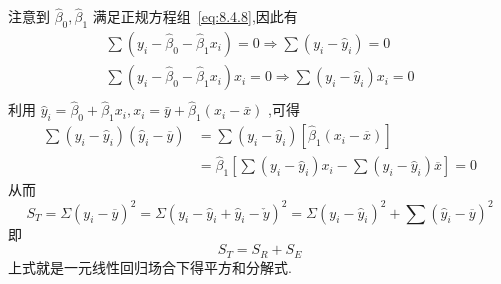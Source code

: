 注意到 $ \hat{\beta}_0, \hat{\beta}_1 $ 满足正规方程组~\ref{eq:8.4.8},因此有
\[
\begin{array}{c}
\sum{\left( y_i-\widehat{\beta }_0-\widehat{\beta }_1x_i \right) =0\Rightarrow \sum{\left( y_i-\hat{y}_i \right)}}=0\\
\sum{\left( y_i-\widehat{\beta }_0-\widehat{\beta }_1x_i \right) x_i=0\Rightarrow \sum{\left( y_i-\hat{y}_i \right)}}x_i=0\\
\end{array}
\]
利用 $ \widehat{y}_i=\widehat{\beta }_0+\widehat{\beta }_1x_i,x_i=\bar{y}+\widehat{\beta }_1\left( x_i-\bar{x} \right)  $ ,可得 
\[
\begin{aligned} 
\sum\left(y_{i}-\hat{y}_{i}\right)\left(\hat{y}_{i}-\overline{y}\right) &=\sum\left(y_{i}-\hat{y}_{i}\right)\left[\hat{\beta}_{1}\left(x_{i}-\overline{x}\right)\right] \\ &=\hat{\beta}_{1}\left[\sum\left(y_{i}-\hat{y}_{i}\right) x_{i}-\sum\left(y_{i}-\hat{y}_{i}\right) \overline{x}\right]=0 
\end{aligned}
\]
从而
\[
S_{T}=\Sigma\left(y_{i}-\overline{y}\right)^{2}=\Sigma\left(y_{i}-\hat{y}_{i}+\hat{y}_{i}-\check{y}\right)^{2}=\Sigma\left(y_{i}-\hat{y}_{i}\right)^{2}+\sum\left(\hat{y}_{i}-\overline{y}\right)^{2}
\]
即
\begin{equation}
S_T=S_R+S_E \label{eq:8.4.13}
\end{equation}
上式就是一元线性回归场合下得平方和分解式.

